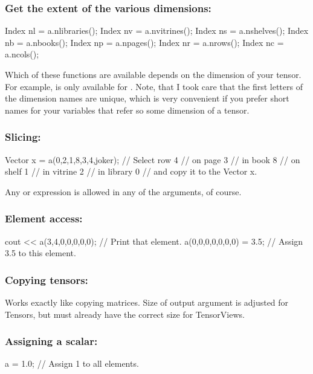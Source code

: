 \subsubsection{Get the extent of the various dimensions:}
\begin{code}
Index nl = a.nlibraries();
Index nv = a.nvitrines();
Index ns = a.nshelves();
Index nb = a.nbooks();
Index np = a.npages();
Index nr = a.nrows();
Index nc = a.ncols();
\end{code}

Which of these functions are available depends on the dimension of
your tensor. For example,  is only available for
. Note, that I took care that the first letters of the
dimension names are unique, which is very convenient if you prefer short
names for your variables that refer so some dimension of a tensor.

\subsubsection{Slicing:}
\begin{code}
Vector x = a(0,2,1,8,3,4,joker);
// Select row 4
// on page 3 
// in book 8
// on shelf 1 
// in vitrine 2 
// in library 0
// and copy it to the Vector x.
\end{code}

Any  or  expression is allowed in any of the
arguments, of course.

\subsubsection{Element access:}
\begin{code}
cout << a(3,4,0,0,0,0,0); // Print that element.
a(0,0,0,0,0,0,0) = 3.5;   // Assign 3.5 to this element.
\end{code}

\subsubsection{Copying tensors:}

Works exactly like copying matrices. Size of output argument is
adjusted for Tensors, but must already have the correct size for
TensorViews.

\subsubsection{Assigning a scalar:}
\begin{code}
a = 1.0;                        // Assign 1 to all elements.
\end{code}


